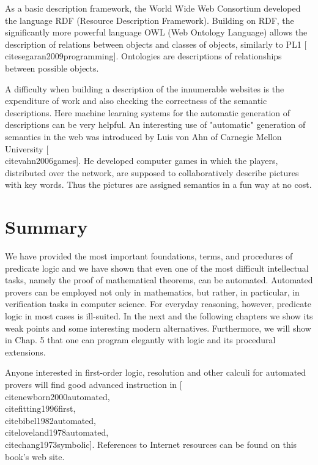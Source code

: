 \documentclass[10pt]{book}
\begin{document}
As a basic description framework, the World Wide Web Consortium developed the language RDF (Resource Description Framework). Building on RDF, the significantly more powerful language OWL (Web Ontology Language) allows the description of relations between objects and classes of objects, similarly to PL1 [\\cite{segaran2009programming}]. Ontologies are descriptions of relationships between possible objects.


A difficulty when building a description of the innumerable websites is the expenditure of work and also checking the correctness of the semantic descriptions. Here machine learning systems for the automatic generation of descriptions can be very helpful. An interesting use of "automatic" generation of semantics in the web was introduced by Luis von Ahn of Carnegie Mellon University [\\cite{vahn2006games}]. He developed computer games in which the players, distributed over the network, are supposed to collaboratively describe pictures with key words. Thus the pictures are assigned semantics in a fun way at no cost.

\section{Summary}
We have provided the most important foundations, terms, and procedures of predicate logic and we have shown that even one of the most difficult intellectual tasks, namely the proof of mathematical theorems, can be automated. Automated provers can be employed not only in mathematics, but rather, in particular, in verification tasks in computer science. For everyday reasoning, however, predicate logic in most cases is ill-suited. In the next and the following chapters we show its weak points and some interesting modern alternatives. Furthermore, we will show in Chap. 5 that one can program elegantly with logic and its procedural extensions.

Anyone interested in first-order logic, resolution and other calculi for automated provers will find good advanced instruction in [\\cite{newborn2000automated}, \\cite{fitting1996first}, \\cite{bibel1982automated}, \\cite{loveland1978automated}, \\cite{chang1973symbolic}]. References to Internet resources can be found on this book's web site.
\end{document}
